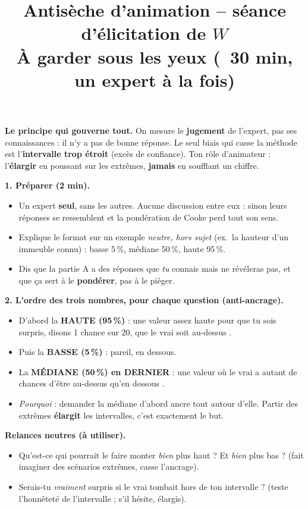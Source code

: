 \documentclass[11pt,a4paper]{article}
\title{\vspace{-1.4cm}\color{navy}\bfseries Antisèche d'animation -- séance d'élicitation de $W$\\[2pt]
  \large À garder sous les yeux (~30 min, \textbf{un expert à la fois})}
\date{}
\begin{document}
\maketitle
\vspace{-1.4cm}

\begin{cle}
\textbf{Le principe qui gouverne tout.} On mesure le \textbf{jugement} de l'expert, pas ses
connaissances : il n'y a pas de bonne réponse. Le seul biais qui casse la méthode est
l'\textbf{intervalle trop étroit} (excès de confiance). Ton rôle d'animateur : l'\textbf{élargir}
en poussant sur les extrêmes, \textbf{jamais} en soufflant un chiffre.
\end{cle}

\vspace{4pt}
\textbf{1. Préparer (2 min).}
\begin{itemize}
\item Un expert \textbf{seul}, sans les autres. Aucune discussion entre eux : sinon leurs
      réponses se ressemblent et la pondération de Cooke perd tout son sens.
\item Explique le format sur un exemple \emph{neutre, hors sujet} (ex.\ la hauteur d'un
      immeuble connu) : basse 5\,\%, médiane 50\,\%, haute 95\,\%.
\item Dis que la partie A a des réponses que \emph{tu} connais mais ne révéleras pas, et que
      ça sert à le \textbf{pondérer}, pas à le piéger.
\end{itemize}

\textbf{2. L'ordre des trois nombres, pour chaque question (anti-ancrage).}
\begin{itemize}
\item D'abord la \textbf{HAUTE (95\,\%)} : \og une valeur assez haute pour que tu sois
      surpris, disons 1 chance sur 20, que le vrai soit au-dessus \fg.
\item Puis la \textbf{BASSE (5\,\%)} : pareil, en dessous.
\item La \textbf{MÉDIANE (50\,\%) en DERNIER} : \og une valeur où le vrai a autant de chances
      d'être au-dessus qu'en dessous \fg.
\item \emph{Pourquoi} : demander la médiane d'abord ancre tout autour d'elle. Partir des
      extrêmes \textbf{élargit} les intervalles, c'est exactement le but.
\end{itemize}

\vspace{2pt}
\begin{oui}
\textbf{Relances neutres (à utiliser).}
\begin{itemize}[topsep=1pt]
\item \og Qu'est-ce qui pourrait le faire monter \emph{bien} plus haut ? Et \emph{bien} plus
      bas ? \fg{} (fait imaginer des scénarios extrêmes, casse l'ancrage).
\item \og Serais-tu \emph{vraiment} surpris si le vrai tombait hors de ton intervalle ? \fg{}
      (teste l'honnêteté de l'intervalle ; s'il hésite, élargis).
\end{itemize}
\end{oui}
\end{document}

